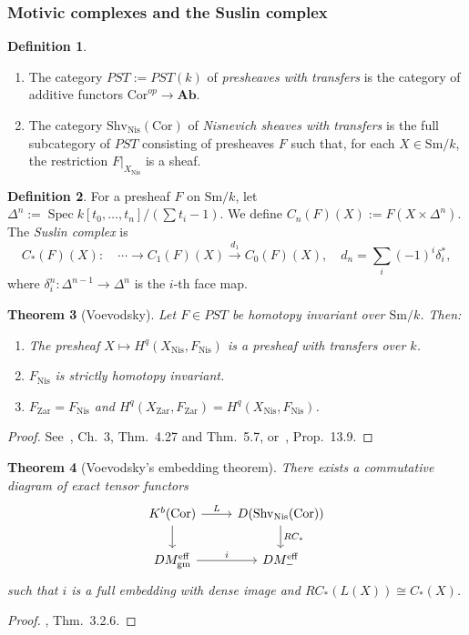 \documentclass[12pt,a4paper]{article}
\newtheorem{theorem}{Theorem}[section]
\theoremstyle{definition}
\newtheorem{definition}[theorem]{Definition}
\newcommand{\Ab}{\mathbf{Ab}}
\newcommand{\Sm}{\mathrm{Sm}}
\newcommand{\Cor}{\mathrm{Cor}}
\newcommand{\PST}{\mathit{PST}}
\newcommand{\DMeff}{DM^{\mathrm{eff}}_{-}}
\newcommand{\ShvNis}{\mathrm{Shv}_{\mathrm{Nis}}}
\begin{document}
\subsubsection{Motivic complexes and the Suslin complex}

\begin{definition}\label{def:PST}
\begin{enumerate}
  \item The category $\PST:=\PST(k)$ of \emph{presheaves with transfers} is the
    category of additive functors $\Cor^{op}\to\Ab$.
  \item The category $\ShvNis(\Cor)$ of \emph{Nisnevich sheaves with transfers} is
    the full subcategory of $\PST$ consisting of presheaves $F$ such that, for
    each $X\in\Sm/k$, the restriction $F|_{X_{\mathrm{Nis}}}$ is a sheaf.
\end{enumerate}
\end{definition}

\begin{definition}\label{def:Suslin-complex}
For a presheaf $F$ on $\Sm/k$, let $\Delta^n:=\operatorname{Spec} k[t_0,\ldots,t_n]/(\sum t_i -1)$.
We define $C_n(F)(X):=F(X\times\Delta^n)$.  The \emph{Suslin complex} is
\[
  C_*(F)(X):\quad\cdots\to C_1(F)(X)\xrightarrow{d_1} C_0(F)(X),
  \quad d_n=\sum_i(-1)^i\delta_i^*,
\]
where $\delta_i^n:\Delta^{n-1}\to\Delta^n$ is the $i$-th face map.
\end{definition}

\begin{theorem}[Voevodsky]\label{thm:Voevodsky-key}
Let $F\in\PST$ be homotopy invariant over $\Sm/k$.  Then:
\begin{enumerate}
  \item The presheaf $X\mapsto H^q(X_{\mathrm{Nis}},F_{\mathrm{Nis}})$ is a presheaf
    with transfers over $k$.
  \item $F_{\mathrm{Nis}}$ is strictly homotopy invariant.
  \item $F_{\mathrm{Zar}}=F_{\mathrm{Nis}}$ and
    $H^q(X_{\mathrm{Zar}},F_{\mathrm{Zar}})=H^q(X_{\mathrm{Nis}},F_{\mathrm{Nis}})$.
\end{enumerate}
\end{theorem}
\begin{proof}
See~\cite{VSF00}, Ch.\ 3, Thm.\ 4.27 and Thm.\ 5.7, or~\cite{MVW06}, Prop.\ 13.9.
\end{proof}

\begin{theorem}[Voevodsky's embedding theorem]\label{thm:embedding}
There exists a commutative diagram of exact tensor functors
\[
\begin{tikzcd}
  K^b(\Cor) \ar[r,"L"] \ar[d] & D(\ShvNis(\Cor)) \ar[d,"RC_*"]\\
  DM^{\mathrm{eff}}_{\mathrm{gm}} \ar[r,"i"] & \DMeff
\end{tikzcd}
\]
such that $i$ is a full embedding with dense image and $RC_*(L(X))\cong C_*(X)$.
\end{theorem}
\begin{proof}
\cite{VSF00}, Thm.\ 3.2.6.
\end{proof}
\end{document}
